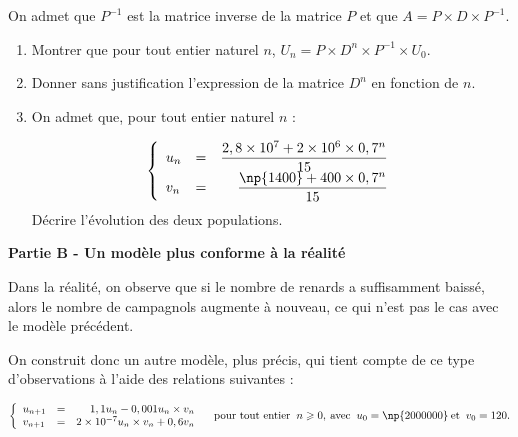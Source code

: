 \documentclass{cornouaille}
\begin{document}
\begin{exercice}[Spécialité][5]
\begin{enumerate}
On admet que $P^{- 1}$ est la matrice inverse de la matrice $P$ et que $A = P \times D \times P^{- 1}$.
	\begin{enumerate}
		\item Montrer que pour tout entier naturel $n$,\: $U_n = P \times D^n \times P^{- 1} \times U_0$.
		\item Donner sans justification l'expression de la matrice $D^n$ en fonction de $n$.
		\item On admet que, pour tout entier naturel $n$ :
	
\renewcommand\arraystretch{1.8}	
\[\left\{\begin{array}{l c r}
u_n &=& \dfrac{2,8 \times 10^7 + 2 \times 10^6 \times 0,7^n}{15}\\

v_n &=&\dfrac{\np{1400} + 400 \times 0,7^n}{15}
		\end{array}\right.\]
\renewcommand\arraystretch{1}	
Décrire l'évolution des deux populations.
	\end{enumerate}
\end{enumerate}

\bigskip

\textbf{Partie B - Un modèle plus conforme à la réalité}

\medskip

Dans la réalité, on observe que si le nombre de renards a suffisamment baissé, alors le nombre de
campagnols augmente à nouveau, ce qui n'est pas le cas avec le modèle précédent. 

On construit donc un autre modèle, plus précis, qui tient compte de ce type d'observations à l'aide des relations suivantes :

\[\left\{\begin{array}{l c r}
u_{n+1} &=& 1,1u_n - 0,001u_n \times v_n\\
v_{n+1} &=& 2 \times 10^{-7} u_n \times v_n + 0,6v_n
\end{array}\right.\quad \text{pour tout entier }\:n \geqslant 0,\: \text{avec }\:u_0 = \np{2000000}\: \text{et }\: v_0 = 120.\]

\medskip


\end{exercice}
\end{document}
